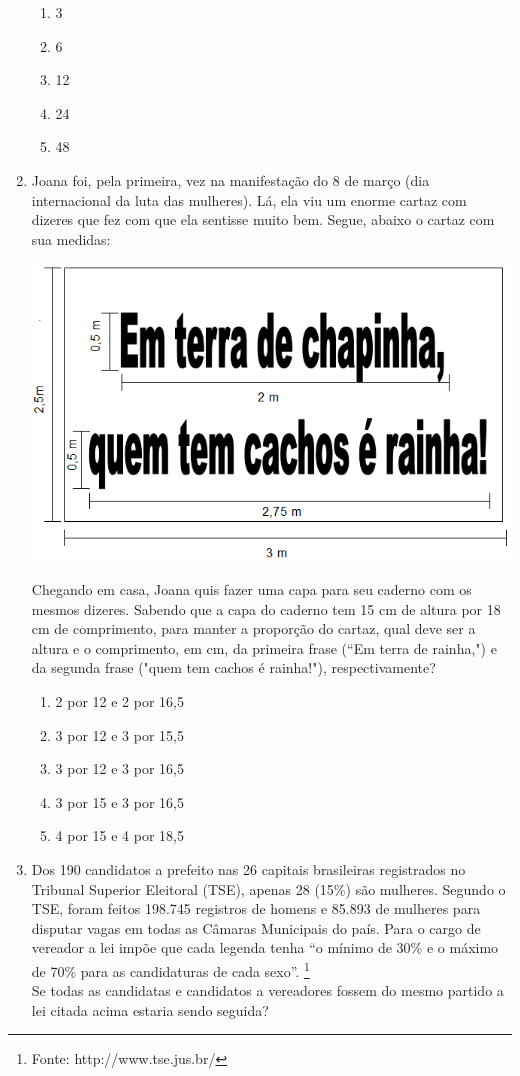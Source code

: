 \documentclass[10pt,a4paper]{article}
\newenvironment{Figure}
  {\par\medskip\noindent\minipage{\linewidth}}
  {\endminipage\par\medskip}
\begin{document}
\begin{multicols}{2}
\begin{enumerate}
		\begin{enumerate}
		\item 3
		\item 6
		\item 12
		\item 24
		\item 48
		\end{enumerate}

	\item Joana foi, pela primeira, vez na manifesta\c{c}\~ao do 8 de mar\c{c}o (dia internacional da luta das mulheres). L\'a, ela viu um enorme cartaz com dizeres que fez com que ela sentisse muito bem. Segue, abaixo o cartaz com sua medidas:

\begin{Figure}
     \centering
     \includegraphics[width=\linewidth]{cartaz.png}
\end{Figure}

Chegando em casa, Joana quis fazer uma capa para seu caderno com os mesmos dizeres. Sabendo que a capa do caderno tem 15 cm de altura por 18 cm de comprimento, para manter a propor\c{c}\~ao do cartaz, qual deve ser a altura e o comprimento, em cm, da primeira frase (``Em terra de rainha,") e da segunda frase ("quem tem cachos \'e rainha!"), respectivamente?

		\begin{enumerate}
		\item 2 por 12 e 2 por 16,5
		\item 3 por 12 e 3 por 15,5
		\item 3 por 12 e 3 por 16,5
		\item 3 por 15 e 3 por 16,5
		\item 4 por 15 e 4 por 18,5
		\end{enumerate}
	\item Dos 190 candidatos a prefeito nas 26 capitais brasileiras registrados no Tribunal Superior Eleitoral (TSE), apenas 28 (15\%) s\~ao mulheres. Segundo o TSE, foram feitos 198.745 registros de homens e 85.893 de mulheres para disputar vagas em todas as Câmaras Municipais do pa\'is. Para o cargo de vereador a lei imp\~oe que cada legenda tenha “o m\'inimo de 30\% e o m\'aximo de 70\% para as candidaturas de cada sexo”. \footnote{Fonte: http://www.tse.jus.br/} \\
	Se todas as candidatas e candidatos a vereadores fossem do mesmo partido a lei citada acima estaria sendo seguida?


\end{enumerate}
\end{multicols}
\end{document}

